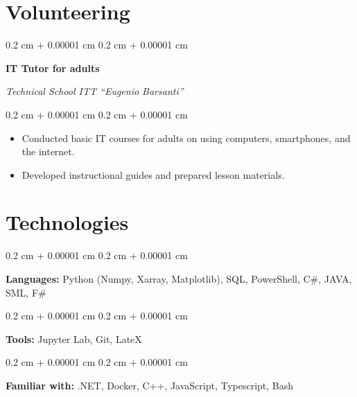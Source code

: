 \documentclass[10pt, a4paper]{article}
\newenvironment{highlights}{
    \begin{itemize}[
        topsep=0.10 cm,
        parsep=0.10 cm,
        partopsep=0pt,
        itemsep=0pt,
        leftmargin=0.4 cm + 10pt
    ]
}{
    \end{itemize}
} %
\newenvironment{onecolentry}{
    \begin{adjustwidth}{
        0.2 cm + 0.00001 cm
    }{
        0.2 cm + 0.00001 cm
    }
}{
    \end{adjustwidth}
} %
\newenvironment{twocolentry}[2][]{
    \onecolentry
    \def\secondColumn{#2}
    \setcolumnwidth{\fill, 6.5 cm}
    \begin{paracol}{2}
}{
    \switchcolumn \raggedleft \secondColumn
    \end{paracol}
    \endonecolentry
} %
\begin{document}
    
    \section{Volunteering}



        
        \begin{twocolentry}{
        \textit{Technical School ITT “Eugenio Barsanti”}    
            
        }
            \textbf{IT Tutor for adults}
        \end{twocolentry}

        \vspace{0.10 cm}
        \begin{onecolentry}
            \begin{highlights}
                \item Conducted basic IT courses for adults on using computers, smartphones, and the internet.
                \item Developed instructional guides and prepared lesson materials.
            \end{highlights}
        \end{onecolentry}



    
    \section{Technologies}



        
        \begin{onecolentry}
            \textbf{Languages:} Python (Numpy, Xarray, Matplotlib), SQL, PowerShell, C\#, JAVA, SML, F\#
        \end{onecolentry}

        \vspace{0.4 cm}

        \begin{onecolentry}
            \textbf{Tools:} Jupyter Lab, Git, LateX
        \end{onecolentry}

        \vspace{0.4 cm}

        \begin{onecolentry}
            \textbf{Familiar with:} .NET, Docker, C++, JavaScript, Typescript, Bash
        \end{onecolentry}


    
\end{document}
